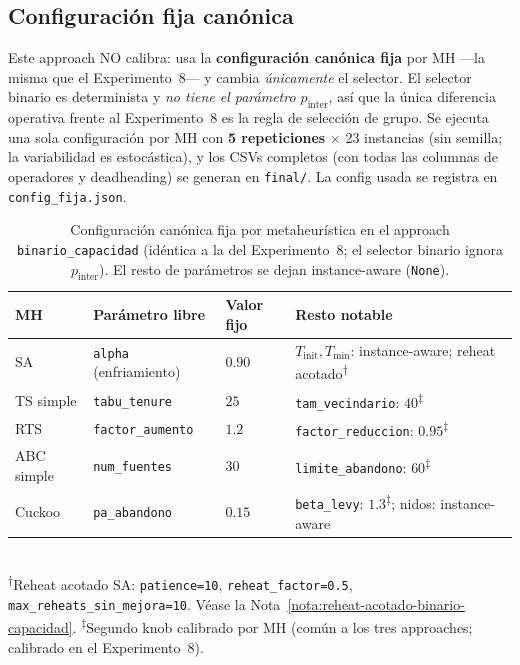 \subsection{Configuración fija canónica}
\label{subsec:config-fija-binario-capacidad}

Este approach NO calibra: usa la \textbf{configuración canónica fija} por
MH ---la misma que el Experimento~8--- y cambia \emph{únicamente} el
selector. El selector binario es determinista y \emph{no tiene el
parámetro $p_{\text{inter}}$}, así que la única diferencia operativa frente
al Experimento~8 es la regla de selección de grupo. Se ejecuta una sola
configuración por MH con \textbf{5 repeticiones} $\times$ 23 instancias
(sin semilla; la variabilidad es estocástica), y los CSVs completos (con
todas las columnas de operadores y deadheading) se generan en
\texttt{final/}. La config usada se registra en \texttt{config\_fija.json}.

\begin{table}[h]
\centering
\caption{Configuración canónica fija por metaheurística en el approach
         \texttt{binario\_capacidad} (idéntica a la del Experimento~8; el
         selector binario ignora $p_{\text{inter}}$). El resto de
         parámetros se dejan instance-aware (\texttt{None}).}
\label{tab:grid-binario-capacidad}
\small
\begin{tabular}{llll}
\toprule
MH & Parámetro libre & Valor fijo & Resto notable \\
\midrule
SA           & \texttt{alpha} (enfriamiento)   & $0.90$  &
  $T_{\text{init}}, T_{\min}$: instance-aware; reheat acotado\textsuperscript{†} \\
TS simple    & \texttt{tabu\_tenure}            & $25$    &
  \texttt{tam\_vecindario}: $40$\textsuperscript{‡} \\
RTS          & \texttt{factor\_aumento}         & $1.2$   &
  \texttt{factor\_reduccion}: $0.95$\textsuperscript{‡} \\
ABC simple   & \texttt{num\_fuentes}            & $30$    &
  \texttt{limite\_abandono}: $60$\textsuperscript{‡} \\
Cuckoo       & \texttt{pa\_abandono}            & $0.15$  &
  \texttt{beta\_levy}: $1.3$\textsuperscript{‡}; nidos: instance-aware \\
\bottomrule
\end{tabular}
\\[4pt]
\footnotesize
\textsuperscript{†}Reheat acotado SA: \texttt{patience=10},
\texttt{reheat\_factor=0.5}, \texttt{max\_reheats\_sin\_mejora=10}.
Véase la Nota~\ref{nota:reheat-acotado-binario-capacidad}.
\textsuperscript{‡}Segundo knob calibrado por MH (común a los tres approaches;
calibrado en el Experimento~8).
\end{table}

